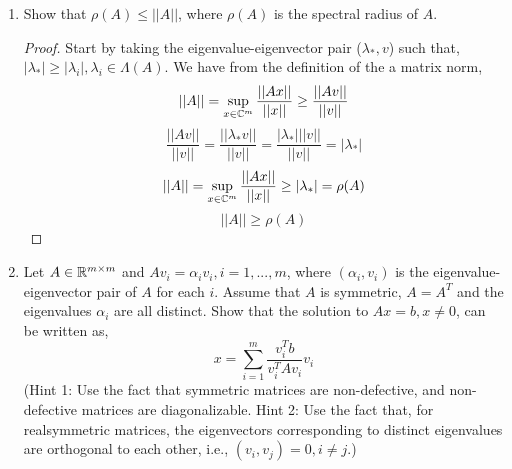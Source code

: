 \documentclass{article}
\begin{document}
\begin{enumerate}
\begin{enumerate}
\begin{proof}
        \end{proof}

        \item
        Show that $I - A$ is nonsingular
        \begin{proof}
            To show that $\I - A$ is nonsingular we simply need to show that $\det(\I - A) \neq 0$. We have, 
            \[
                \det(\I - A) = (-1)^m\det(A - \I)
            \]
            We notice that $\det(A - \I)$ looks very similar to the definition of the characteristic polynomial, $\det(A - \lambda\I)$. We have then by the definition of a characteristic polynomial, 
            \[
                \det(\I - A) = (-1)^m\det(A - \I) = 0, \text{ if and only if } \lambda = 1 \text{ is an eigenvalue of } A.
            \]
            We have from part (a) of the problem that all eigenvalues of $A$ are pure imaginary, i.e. $\lambda \neq 1$. Therefore
            \[
                \det(\I - A) = (-1)^m\det(A - \I) \neq 0
            \]
            Therefore, $\I - A$ is nonsingular by definition. 
        \end{proof}

     \end{enumerate}
    
     \item 
      Show that $\rho(A) \le ||A||$, where $\rho(A)$ is the spectral radius of $A$.
    
    \begin{proof}

    Start by taking the eigenvalue-eigenvector pair ($\lambda_*, v$) such that, $|\lambda_*| \ge |\lambda_i|, \lambda_i \in \Lambda(A)$. We have from the definition of the a matrix norm, 
    \[
        ||A|| = \sup_{x \in \mathbb{C}^m} \frac{||Ax||}{||x||} \ge \frac{||Av||}{||v||}
    \]
    \[
        \frac{||Av||}{||v||} = \frac{||\lambda_* v||}{||v||} = \frac{|\lambda_*| ||v||}{||v||} = |\lambda_*|
    \]
    \[
        ||A|| = \sup_{x \in \mathbb{C}^m} \frac{||Ax||}{||x||} \ge |\lambda_*| = \rho(A)
    \]
    \[
        ||A|| \ge \rho(A)   
    \]
    \end{proof}

    \item 
    Let $A \in \mathbb{R}^{m\times m}$ and $Av_i = \alpha_i v_i, i = 1, . . . , m$, where $(\alpha_i , v_i)$ is the eigenvalue-eigenvector pair of $A$ for each $i$. Assume that $A$ is symmetric, $A = A^T$ and the eigenvalues $\alpha_i$ are all distinct. Show that the solution to $Ax = b, x \neq 0$, can be written as, 
\[
    x = \sum_{i=1}^m\frac{v_i^Tb}{v_i^TAv_i}v_i
\]
(Hint 1: Use the fact that symmetric matrices are non-defective, and non-defective matrices are diagonalizable. Hint 2: Use the fact that, for realsymmetric matrices, the eigenvectors corresponding to distinct eigenvalues are orthogonal to each other, i.e., $(v_i , v_j) = 0, i \neq j.$)
   

\end{enumerate}
\end{document}
